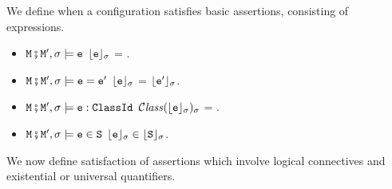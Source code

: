 \begin{definition} We define   when a configuration satisfies basic assertions, consisting of %
expressions.
 \label{def:valid:assertion:basic}
\begin{itemize}
\item
$\M\mkpair \M', \sigma \models\SE$ \IFF  $\interp{\SE}{\sigma}$ = .
\item
$\M\mkpair \M', \sigma \models\SE=\SEPrime$ \IFF $\interp{\SE}{\sigma}$ = $\interp{\SEPrime}{\sigma}$.
\item
$\M\mkpair \M', \sigma \models\SE:\prg{ClassId}$ \IFF $\ClassOf{\interp{\SE}{\sigma}}{\sigma}$ = .
\item
$\M\mkpair \M', \sigma \models \SE\in \prg{S}$ \IFF $\interp{\SE}{\sigma}\in \interp{\prg{S}}{\sigma}$.
\end{itemize}
\end{definition}

We now define satisfaction of assertions which involve logical connectives and existential or universal quantifiers.

